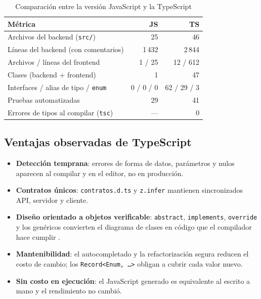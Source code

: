 \documentclass[conference,a4paper]{IEEEtran}
\begin{document}
\begin{table}[!t]
\centering
\caption{Comparación entre la versión JavaScript y la TypeScript}
\label{tab:metricas}
\footnotesize
\begin{tabularx}{\columnwidth}{@{}Xrr@{}}
\toprule
\textbf{Métrica} & \textbf{JS} & \textbf{TS} \\
\midrule
Archivos del backend (\texttt{src/}) & 25 & 46 \\
Líneas del backend (con comentarios) & 1\,432 & 2\,844 \\
Archivos / líneas del frontend & 1 / 25 & 12 / 612 \\
Clases (backend + frontend) & 1 & 47 \\
Interfaces / alias de tipo / \texttt{enum} & 0 / 0 / 0 & 62 / 29 / 3 \\
Pruebas automatizadas & 29 & 41 \\
Errores de tipos al compilar (\texttt{tsc}) & --- & 0 \\
\bottomrule
\end{tabularx}
\end{table}

\subsection{Ventajas observadas de TypeScript}
\begin{itemize}
\item \textbf{Detección temprana}: errores de forma de datos, parámetros y nulos aparecen al compilar y en el editor, no en producción.
\item \textbf{Contratos únicos}: \texttt{contratos.d.ts} y \texttt{z.infer} mantienen sincronizados API, servidor y cliente.
\item \textbf{Diseño orientado a objetos verificable}: \texttt{abstract}, \texttt{implements}, \texttt{override} y los genéricos convierten el diagrama de clases en código que el compilador hace cumplir \cite{gamma1994}.
\item \textbf{Mantenibilidad}: el autocompletado y la refactorización segura reducen el costo de cambio; los \texttt{Record<Enum, \ldots>} obligan a cubrir cada valor nuevo.
\item \textbf{Sin costo en ejecución}: el JavaScript generado es equivalente al escrito a mano y el rendimiento no cambió.
\end{itemize}

\end{document}
